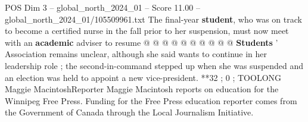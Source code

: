 \begin{textsample}{POS Dim 3 – global\_north\_2024\_01 – Score 11.00 – global\_north\_2024\_01/105509961.txt}
The final-year \textbf{student}, who was on track to become a certified nurse in the fall prior to her suspension, must now meet with an \textbf{academic} adviser to resume @ @ @ @ @ @ @ @ @ @ \textbf{Students} ' Association remains unclear, although she said wants to continue in her leadership role ; the second-in-command stepped up when she was suspended and an election was held to appoint a new vice-president. **32 ; 0 ; TOOLONG Maggie MacintoshReporter Maggie Macintosh reports on education for the Winnipeg Free Press.
Funding for the Free Press education reporter comes from the Government of Canada through the Local Journalism Initiative.

\end{textsample}
